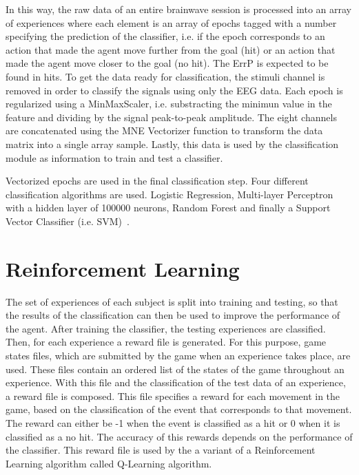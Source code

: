 \documentclass[journal]{IEEEtran}
\begin{document}
{In this way, the raw data of an entire brainwave session is processed into an array of experiences where each element is an array of epochs tagged with a number specifying the prediction of the classifier, i.e. if the epoch corresponds to an action that made the agent move further from the goal (hit) or an action that made the agent move closer to the goal (no hit). The ErrP is expected to be found in hits. To get the data ready for classification, the stimuli channel is removed in order to classify the signals using only the EEG data. Each epoch is regularized using a MinMaxScaler, i.e. substracting the minimun value in the feature and dividing by the signal peak-to-peak amplitude.  The eight channels are concatenated using the  MNE Vectorizer function to transform the data matrix into a single array sample. Lastly, this data is used by the classification module as information to train and test a classifier.

Vectorized epochs are used in the final classification step.  Four different classification algorithms are used.  Logistic Regression, Multi-layer Perceptron with a hidden layer of 100000 neurons, Random Forest and finally a Support Vector Classifier (i.e. SVM)~\cite{Lotte2018}.  



\section{Reinforcement Learning}
\label{learning}

The set of experiences of each subject is split into training and testing, so that the results of the classification can then be used to improve the performance of the agent. After training the classifier, the testing experiences are classified. Then, for each experience a reward file is generated. For this purpose, game states files, which are submitted by the game when an experience takes place, are used. These files contain an ordered list of the states of the game throughout an experience. With this file and the classification of the test data of an experience, a reward file is composed. This file specifies a reward for each movement in the game, based on the classification of the event that corresponds to that movement. The reward can either be -1 when the event is classified as a hit or 0 when it is classified as a no hit. The accuracy of this rewards depends on the performance of the classifier. This reward file is used by the a variant of a Reinforcement Learning algorithm called Q-Learning algorithm.


}
\end{document}
